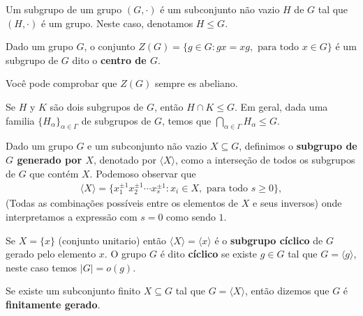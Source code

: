 \begin{definition}[Subgrupo]
  Um subgrupo de um grupo $(G,\cdot)$ é um subconjunto não vazio $H$ de $G$ tal que $(H,\cdot)$ é um grupo. Neste caso, denotamos $H\leq G$. 
\end{definition}
\begin{example}[Centro de $G$]
  Dado um grupo $G$, o conjunto $Z(G)=\{g\in G:gx=xg, \text{ para todo }x\in G\}$ é um subgrupo de $G$ dito o \textbf{centro de $G$}. 
\end{example}
\begin{note}
  Você pode comprobar que $Z(G)$ sempre es abeliano. 
\end{note}
\begin{example}
  Se $H$ y $K$ são dois subgrupos de $G$, então $H\cap K\leq G$. Em geral, dada uma familia $\{H_\alpha\}_{\alpha\in\Gamma}$ de subgrupos de $G$, temos que $\displaystyle \bigcap_{\alpha\in\Gamma}H_{\alpha}\leq G$. 
\end{example}
\begin{example}[Generado]
  Dado um grupo $G$ e um subconjunto não vazio $X\subseteq G$, definimos o \textbf{subgrupo de $G$ generado por $X$}, denotado por $\langle X\rangle$, como a interseção de todos os subgrupos de $G$ que contém $X$. Podemoso observar que
  \begin{align*}
    \langle X\rangle=\{x_1^{\pm 1}x_2^{\pm 1}\cdots x_s^{\pm 1}:x_i\in X,\text{ para todo }s\geq 0\},
  \end{align*}
  (Todas as combinações possíveis entre os elementos de $X$ e seus inversos) onde interpretamos a expressão com $s=0$ como sendo $1$. 
\end{example}
\begin{note}
  Se $X=\{x\}$ (conjunto unitario) então $\langle X \rangle=\langle x \rangle$ é o \textbf{subgrupo cíclico} de $G$ gerado pelo elemento $x$. O grupo $G$ é dito \textbf{cíclico} se existe $g\in G$ tal que $G=\langle g \rangle$, neste caso temos $|G|=o(g)$. 
\end{note}
\begin{note}
  Se existe um subconjunto finito $X\subseteq G$ tal que $G=\langle 
  X\rangle$, então dizemos que $G$ é \textbf{finitamente gerado}. 
\end{note}
